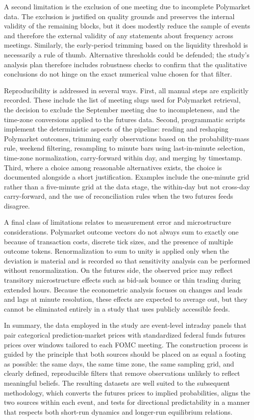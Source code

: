 A second limitation is the exclusion of one meeting due to incomplete Polymarket data. The exclusion is justified on quality grounds and preserves the internal validity of the remaining blocks, but it does modestly reduce the sample of events and therefore the external validity of any statements about frequency across meetings. Similarly, the early-period trimming based on the liquidity threshold is necessarily a rule of thumb. Alternative thresholds could be defended; the study’s analysis plan therefore includes robustness checks to confirm that the qualitative conclusions do not hinge on the exact numerical value chosen for that filter.

Reproducibility is addressed in several ways. First, all manual steps are explicitly recorded. These include the list of meeting slugs used for Polymarket retrieval, the decision to exclude the September meeting due to incompleteness, and the time-zone conversions applied to the futures data. Second, programmatic scripts implement the deterministic aspects of the pipeline: reading and reshaping Polymarket outcomes, trimming early observations based on the probability-mass rule, weekend filtering, resampling to minute bars using last-in-minute selection, time-zone normalization, carry-forward within day, and merging by timestamp. Third, where a choice among reasonable alternatives exists, the choice is documented alongside a short justification. Examples include the one-minute grid rather than a five-minute grid at the data stage, the within-day but not cross-day carry-forward, and the use of reconciliation rules when the two futures feeds disagree.

A final class of limitations relates to measurement error and microstructure considerations. Polymarket outcome vectors do not always sum to exactly one because of transaction costs, discrete tick sizes, and the presence of multiple outcome tokens. Renormalization to sum to unity is applied only when the deviation is material and is recorded so that sensitivity analysis can be performed without renormalization. On the futures side, the observed price may reflect transitory microstructure effects such as bid-ask bounce or thin trading during extended hours. Because the econometric analysis focuses on changes and leads and lags at minute resolution, these effects are expected to average out, but they cannot be eliminated entirely in a study that uses publicly accessible feeds.

In summary, the data employed in the study are event-level intraday panels that pair categorical prediction-market prices with standardized federal funds futures prices over windows tailored to each FOMC meeting. The construction process is guided by the principle that both sources should be placed on as equal a footing as possible: the same days, the same time zone, the same sampling grid, and clearly defined, reproducible filters that remove observations unlikely to reflect meaningful beliefs. The resulting datasets are well suited to the subsequent methodology, which converts the futures prices to implied probabilities, aligns the two sources within each event, and tests for directional predictability in a manner that respects both short-run dynamics and longer-run equilibrium relations.
